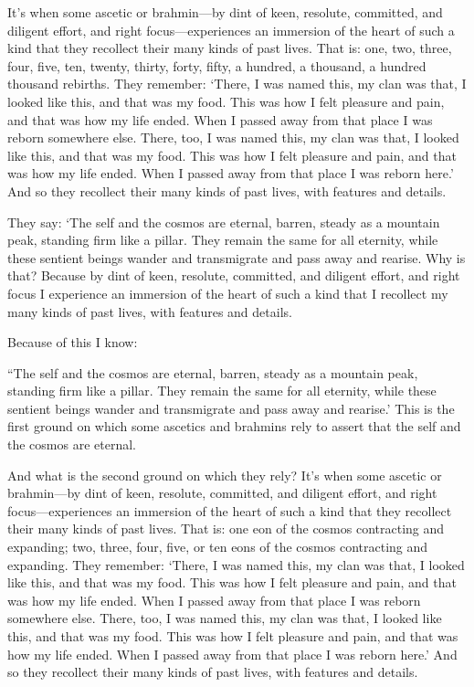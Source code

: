 \documentclass[12pt,openany]{book}%
\begin{document}
It’s when some ascetic or brahmin—by dint of keen, resolute, committed, and diligent effort, and right focus—experiences an immersion of the heart of such a kind that they recollect their many kinds of past lives. That is: one, two, three, four, five, ten, twenty, thirty, forty, fifty, a hundred, a thousand, a hundred thousand rebirths. They remember: ‘There, I was named this, my clan was that, I looked like this, and that was my food. This was how I felt pleasure and pain, and that was how my life ended. When I passed away from that place I was reborn somewhere else. There, too, I was named this, my clan was that, I looked like this, and that was my food. This was how I felt pleasure and pain, and that was how my life ended. When I passed away from that place I was reborn here.’ And so they recollect their many kinds of past lives, with features and details. 

They say: ‘The self and the cosmos are eternal, barren, steady as a mountain peak, standing firm like a pillar. They remain the same for all eternity, while these sentient beings wander and transmigrate and pass away and rearise. Why is that? Because by dint of keen, resolute, committed, and diligent effort, and right focus I experience an immersion of the heart of such a kind that I recollect my many kinds of past lives, with features and details. 

Because of this I know: 

“The self and the cosmos are eternal, barren, steady as a mountain peak, standing firm like a pillar. They remain the same for all eternity, while these sentient beings wander and transmigrate and pass away and rearise.’ This is the first ground on which some ascetics and brahmins rely to assert that the self and the cosmos are eternal. 

And what is the second ground on which they rely? It’s when some ascetic or brahmin—by dint of keen, resolute, committed, and diligent effort, and right focus—experiences an immersion of the heart of such a kind that they recollect their many kinds of past lives. That is: one eon of the cosmos contracting and expanding; two, three, four, five, or ten eons of the cosmos contracting and expanding. They remember: ‘There, I was named this, my clan was that, I looked like this, and that was my food. This was how I felt pleasure and pain, and that was how my life ended. When I passed away from that place I was reborn somewhere else. There, too, I was named this, my clan was that, I looked like this, and that was my food. This was how I felt pleasure and pain, and that was how my life ended. When I passed away from that place I was reborn here.’ And so they recollect their many kinds of past lives, with features and details. 
\end{document}
